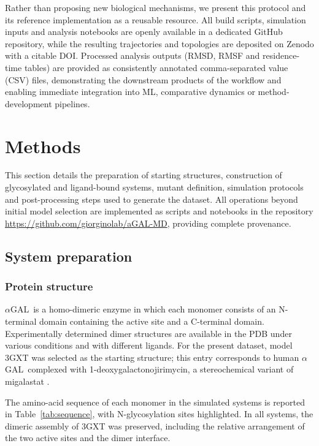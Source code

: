 \documentclass{article}
\newcommand{\agal}{$\alpha$GAL}
\begin{document}
Rather than proposing new biological mechanisms, we present this protocol and its reference implementation as a reusable resource.
All build scripts, simulation inputs and analysis notebooks are openly available in a dedicated GitHub repository, while the resulting trajectories and topologies are deposited on Zenodo with a citable DOI.
Processed analysis outputs (RMSD, RMSF and residence-time tables) are provided as consistently annotated comma-separated value (CSV) files, demonstrating the downstream products of the workflow and enabling immediate integration into ML, comparative dynamics or method-development pipelines.

\section{Methods}

This section details the preparation of starting structures, construction of glycosylated and ligand-bound systems, mutant definition, simulation protocols and post-processing steps used to generate the dataset.
All operations beyond initial model selection are implemented as scripts and notebooks in the repository \url{https://github.com/giorginolab/aGAL-MD}, providing complete provenance.

\subsection{System preparation}

\subsubsection{Protein structure}

\agal\ is a homo-dimeric enzyme in which each monomer consists of an N-terminal domain containing the active site and a C-terminal domain.
Experimentally determined dimer structures are available in the PDB under various conditions and with different ligands.
For the present dataset, model 3GXT was selected as the starting structure; this entry corresponds to human \agal\ complexed with 1-deoxygalactonojirimycin, a stereochemical variant of migalastat \cite{lieberman_effects_2009}.

The amino-acid sequence of each monomer in the simulated systems is reported in Table~\ref{tab:sequence}, with N-glycosylation sites highlighted.
In all systems, the dimeric assembly of 3GXT was preserved, including the relative arrangement of the two active sites and the dimer interface.
\end{document}

